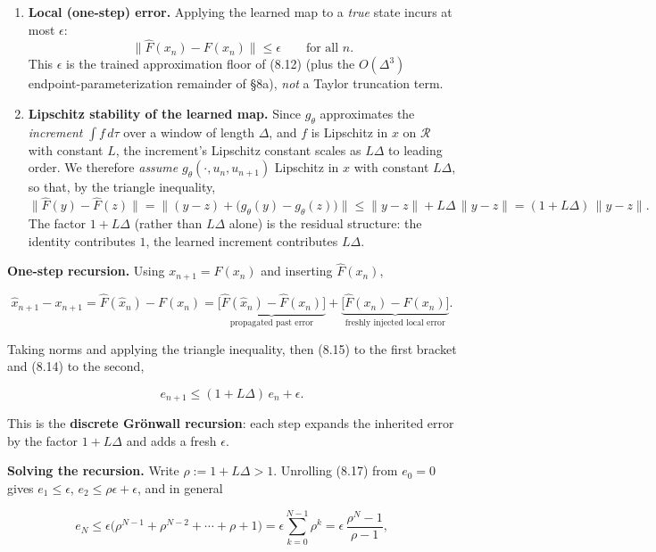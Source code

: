 \documentclass[
  11pt,
]{article}
\providecommand{\gt}{>}
\begin{document}
\begin{enumerate}
\def\labelenumi{\arabic{enumi}.}
\item
  \textbf{Local (one-step) error.} Applying the learned map to a
  \emph{true} state incurs at most \(\epsilon\): \[
  \big\|\widehat{F}(x_{n})-F(x_{n})\big\|\le\epsilon\qquad\text{for all }n.
  \tag{8.14}
  \] This \(\epsilon\) is the trained approximation floor of (8.12)
  (plus the \(O(\Delta^{3})\) endpoint-parameterization remainder of
  §8a), \emph{not} a Taylor truncation term.
\item
  \textbf{Lipschitz stability of the learned map.} Since \(g_{\theta}\)
  approximates the \emph{increment} \(\int f\,d\tau\) over a window of
  length \(\Delta\), and \(f\) is Lipschitz in \(x\) on \(\mathcal{R}\)
  with constant \(L\), the increment's Lipschitz constant scales as
  \(L\Delta\) to leading order. We therefore \emph{assume}
  \(g_{\theta}(\cdot,u_{n},u_{n+1})\) Lipschitz in \(x\) with constant
  \(L\Delta\), so that, by the triangle inequality, \[
  \big\|\widehat{F}(y)-\widehat{F}(z)\big\|=\big\|(y-z)+\big(g_{\theta}(y)-g_{\theta}(z)\big)\big\|\le\|y-z\|+L\Delta\,\|y-z\|=(1+L\Delta)\,\|y-z\|.
  \tag{8.15}
  \] The factor \(1+L\Delta\) (rather than \(L\Delta\) alone) is the
  residual structure: the identity contributes \(1\), the learned
  increment contributes \(L\Delta\).
\end{enumerate}

\textbf{One-step recursion.} Using \(x_{n+1}=F(x_n)\) and inserting
\(\widehat{F}(x_{n})\),

\[
\widehat{x}_{n+1}-x_{n+1}
=\widehat F(\widehat x_n)-F(x_n)
=\underbrace{\big[\widehat{F}(\widehat{x}_{n})-\widehat{F}(x_{n})\big]}_{\text{propagated past error}}
+\underbrace{\big[\widehat{F}(x_{n})-F(x_{n})\big]}_{\text{freshly injected local error}} .
\tag{8.16}
\]

Taking norms and applying the triangle inequality, then (8.15) to the
first bracket and (8.14) to the second,

\[
e_{n+1}\le(1+L\Delta)\,e_{n}+\epsilon .
\tag{8.17}
\]

This is the \textbf{discrete Grönwall recursion}: each step expands the
inherited error by the factor \(1+L\Delta\) and adds a fresh
\(\epsilon\).

\textbf{Solving the recursion.} Write \(\rho:=1+L\Delta\gt 1\).
Unrolling (8.17) from \(e_{0}=0\) gives \(e_1\le\epsilon\),
\(e_2\le\rho\epsilon+\epsilon\), and in general

\[
e_{N}\le \epsilon\big(\rho^{N-1}+\rho^{N-2}+\cdots+\rho+1\big)
=\epsilon\sum_{k=0}^{N-1}\rho^{k}
=\epsilon\,\frac{\rho^{N}-1}{\rho-1},
\]
\end{document}
